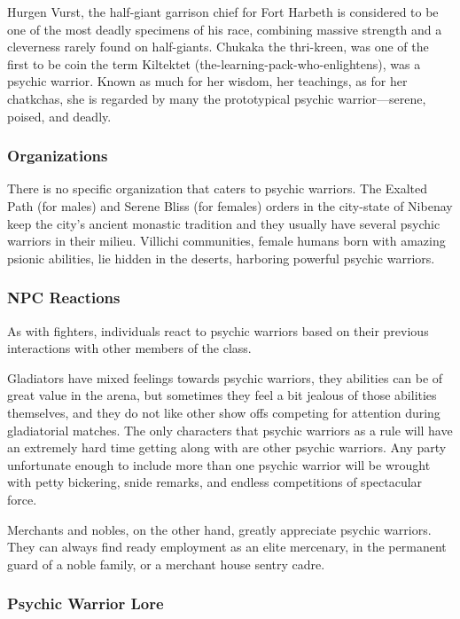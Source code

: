Hurgen Vurst, the half-giant garrison chief for Fort Harbeth is considered to be one of the most deadly specimens of his race, combining massive strength and a cleverness rarely found on half-giants. Chukaka the thri-kreen, was one of the first to be coin the term Kiltektet (the-learning-pack-who-enlightens), was a psychic warrior. Known as much for her wisdom, her teachings, as for her chatkchas, she is regarded by many the prototypical psychic warrior---serene, poised, and deadly.

\subsubsection{Organizations}

There is no specific organization that caters to psychic warriors. The Exalted Path (for males) and Serene Bliss (for females) orders in the city-state of Nibenay keep the city's ancient monastic tradition and they usually have several psychic warriors in their milieu. Villichi communities, female humans born with amazing psionic abilities, lie hidden in the deserts, harboring powerful psychic warriors.

\subsubsection{NPC Reactions}

As with fighters, individuals react to psychic warriors based on their previous interactions with other members of the class.

Gladiators have mixed feelings towards psychic warriors, they abilities can be of great value in the arena, but sometimes they feel a bit jealous of those abilities themselves, and they do not like other show offs competing for attention during gladiatorial matches. The only characters that psychic warriors as a rule will have an extremely hard time getting along with are other psychic warriors. Any party unfortunate enough to include more than one psychic warrior will be wrought with petty bickering, snide remarks, and endless competitions of spectacular force.

Merchants and nobles, on the other hand, greatly appreciate psychic warriors. They can always find ready employment as an elite mercenary, in the permanent guard of a noble family, or a merchant house sentry cadre.

\subsubsection{Psychic Warrior Lore}


